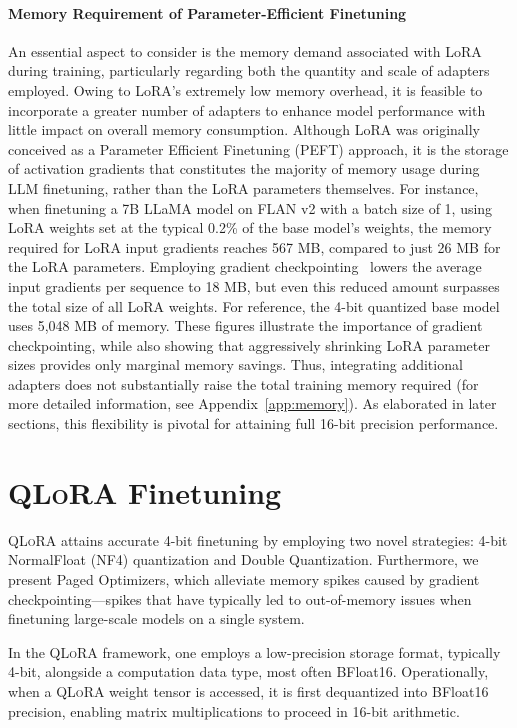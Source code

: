 \paragraph{Memory Requirement of Parameter-Efficient Finetuning} An essential aspect to consider is the memory demand associated with LoRA during training, particularly regarding both the quantity and scale of adapters employed. Owing to LoRA’s extremely low memory overhead, it is feasible to incorporate a greater number of adapters to enhance model performance with little impact on overall memory consumption. Although LoRA was originally conceived as a Parameter Efficient Finetuning (PEFT) approach, it is the storage of activation gradients that constitutes the majority of memory usage during LLM finetuning, rather than the LoRA parameters themselves. For instance, when finetuning a 7B LLaMA model on FLAN v2 with a batch size of 1, using LoRA weights set at the typical 0.2\% of the base model’s weights\citep{hu2021lora,liu2022few}, the memory required for LoRA input gradients reaches 567 MB, compared to just 26 MB for the LoRA parameters. Employing gradient checkpointing~\citep{chen2016training} lowers the average input gradients per sequence to 18 MB, but even this reduced amount surpasses the total size of all LoRA weights. For reference, the 4-bit quantized base model uses 5,048 MB of memory. These figures illustrate the importance of gradient checkpointing, while also showing that aggressively shrinking LoRA parameter sizes provides only marginal memory savings. Thus, integrating additional adapters does not substantially raise the total training memory required (for more detailed information, see Appendix~\ref{app:memory}). As elaborated in later sections, this flexibility is pivotal for attaining full 16-bit precision performance.

\section{\textsc{QLoRA} Finetuning}

\textsc{QLoRA} attains accurate 4-bit finetuning by employing two novel strategies: 4-bit NormalFloat (NF4) quantization and Double Quantization. Furthermore, we present Paged Optimizers, which alleviate memory spikes caused by gradient checkpointing—spikes that have typically led to out-of-memory issues when finetuning large-scale models on a single system.

In the \textsc{QLoRA} framework, one employs a low-precision storage format, typically 4-bit, alongside a computation data type, most often BFloat16. Operationally, when a \textsc{QLoRA} weight tensor is accessed, it is first dequantized into BFloat16 precision, enabling matrix multiplications to proceed in 16-bit arithmetic.

